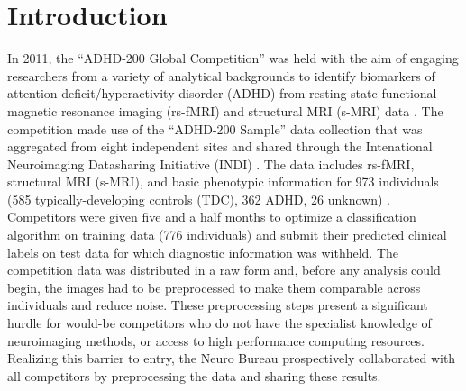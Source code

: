 \documentclass[preprint,12pt,3p]{elsarticle}
\begin{document}

\section{Introduction}

In 2011, the ``ADHD-200 Global Competition'' was held with the aim of engaging researchers from a variety of analytical backgrounds to identify biomarkers of attention-deficit/hyperactivity disorder (ADHD) from resting-state functional magnetic resonance imaging (rs-fMRI) and structural MRI (s-MRI) data \cite{Milham2012}. The competition made use of the ``ADHD-200 Sample'' data collection that was aggregated from eight independent sites and shared through the Intenational Neuroimaging Datasharing Initiative (INDI) \cite{Mennes2013}. The data includes rs-fMRI, structural MRI (s-MRI), and basic phenotypic information for 973 individuals (585 typically-developing controls (TDC), 362 ADHD, 26 unknown) \cite{Milham2012}. Competitors were given five and a half months to optimize a classification algorithm on training data (776 individuals) and submit their predicted clinical labels on test data for which diagnostic information was withheld. The competition data was distributed in a raw form and, before any analysis could begin, the images had to be preprocessed to make them comparable across individuals and reduce noise. These preprocessing steps present a significant hurdle for would-be competitors who do not have the specialist knowledge of neuroimaging methods, or access to high performance computing resources. Realizing this barrier to entry, the Neuro Bureau prospectively collaborated with all competitors by preprocessing the data and sharing these results.
\end{document}
